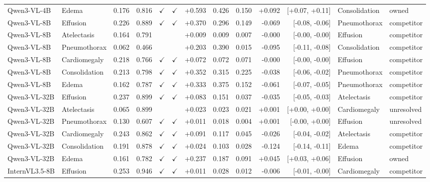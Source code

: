 \begin{longtable}{llrrccrrrrrll}
\rowcolor{cfSlate2}Qwen3-VL-4B & Edema & 0.176 & 0.816 & $\checkmark$ & $\checkmark$ & +0.593 & 0.426 & 0.150 & +0.092 & [+0.07, +0.11] & Consolidation & owned \\
Qwen3-VL-8B & Effusion & 0.226 & 0.889 & $\checkmark$ & $\checkmark$ & +0.370 & 0.296 & 0.149 & -0.069 & [-0.08, -0.06] & Pneumothorax & competitor \\
Qwen3-VL-8B & Atelectasis & 0.164 & 0.791 &  &  & +0.009 & 0.009 & 0.007 & -0.000 & [-0.00, -0.00] & Effusion & competitor \\
Qwen3-VL-8B & Pneumothorax & 0.062 & 0.466 &  &  & +0.203 & 0.390 & 0.015 & -0.095 & [-0.11, -0.08] & Consolidation & competitor \\
Qwen3-VL-8B & Cardiomegaly & 0.218 & 0.766 & $\checkmark$ & $\checkmark$ & +0.072 & 0.072 & 0.071 & -0.000 & [-0.00, -0.00] & Effusion & competitor \\
Qwen3-VL-8B & Consolidation & 0.213 & 0.798 & $\checkmark$ & $\checkmark$ & +0.352 & 0.315 & 0.225 & -0.038 & [-0.06, -0.02] & Pneumothorax & competitor \\
Qwen3-VL-8B & Edema & 0.162 & 0.787 & $\checkmark$ & $\checkmark$ & +0.333 & 0.375 & 0.152 & -0.061 & [-0.07, -0.05] & Pneumothorax & competitor \\
Qwen3-VL-32B & Effusion & 0.237 & 0.899 & $\checkmark$ & $\checkmark$ & +0.083 & 0.151 & 0.037 & -0.035 & [-0.05, -0.03] & Atelectasis & competitor \\
Qwen3-VL-32B & Atelectasis & 0.065 & 0.899 &  &  & +0.023 & 0.023 & 0.021 & +0.001 & [+0.00, +0.00] & Cardiomegaly & unresolved \\
Qwen3-VL-32B & Pneumothorax & 0.130 & 0.607 & $\checkmark$ & $\checkmark$ & +0.011 & 0.018 & 0.004 & +0.001 & [-0.00, +0.00] & Effusion & unresolved \\
Qwen3-VL-32B & Cardiomegaly & 0.243 & 0.862 & $\checkmark$ & $\checkmark$ & +0.091 & 0.117 & 0.045 & -0.026 & [-0.04, -0.02] & Atelectasis & competitor \\
Qwen3-VL-32B & Consolidation & 0.191 & 0.878 & $\checkmark$ & $\checkmark$ & +0.024 & 0.103 & 0.028 & -0.124 & [-0.14, -0.11] & Edema & competitor \\
\rowcolor{cfSlate2}Qwen3-VL-32B & Edema & 0.161 & 0.782 & $\checkmark$ & $\checkmark$ & +0.237 & 0.187 & 0.091 & +0.045 & [+0.03, +0.06] & Effusion & owned \\
InternVL3.5-8B & Effusion & 0.253 & 0.946 & $\checkmark$ & $\checkmark$ & +0.011 & 0.028 & 0.012 & -0.006 & [-0.01, -0.00] & Cardiomegaly & competitor \\

\end{longtable}

